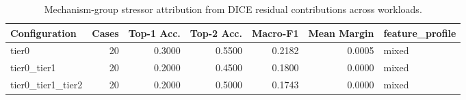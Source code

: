 \begin{table}[t]
\centering
\caption{Mechanism-group stressor attribution from DICE residual contributions across workloads.}
\label{tab:dice_stressor_diagnosis}
\footnotesize
\begin{tabular}{lrrrrrl}
\toprule
Configuration & Cases & Top-1 Acc. & Top-2 Acc. & Macro-F1 & Mean Margin & feature_profile \\
\midrule
tier0 & 20 & 0.3000 & 0.5500 & 0.2182 & 0.0005 & mixed \\
tier0_tier1 & 20 & 0.2000 & 0.4500 & 0.1800 & 0.0000 & mixed \\
tier0_tier1_tier2 & 20 & 0.2000 & 0.5000 & 0.1743 & 0.0000 & mixed \\
\bottomrule
\end{tabular}

\end{table}
